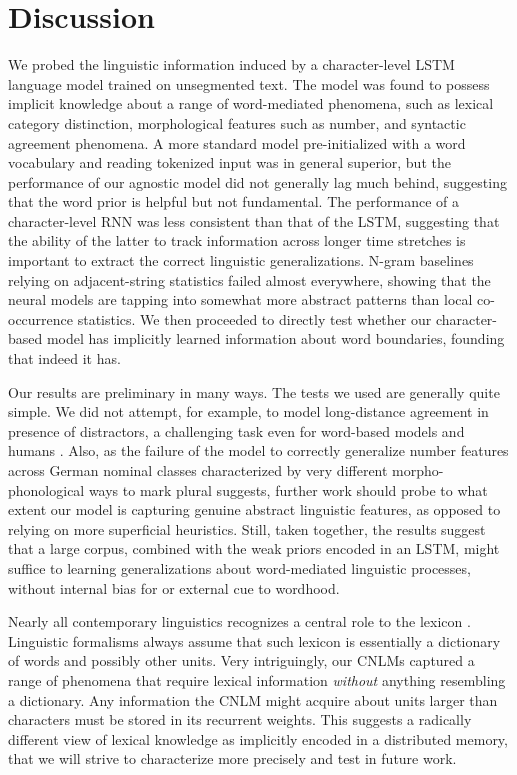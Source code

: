 \section{Discussion}
\label{sec:discussion}

We probed the linguistic information induced by a character-level LSTM
language model trained on unsegmented text. The model was found to
possess implicit knowledge about a range of word-mediated phenomena,
such as lexical category distinction, morphological features such as
number, and syntactic agreement phenomena. A more standard model
pre-initialized with a word vocabulary and reading tokenized input was
in general superior, but the performance of our agnostic model did not
generally lag much behind, suggesting that the word prior is helpful
but not fundamental. The performance of a character-level RNN was less
consistent than that of the LSTM, suggesting that the ability of the
latter to track information across longer time stretches is important
to extract the correct linguistic generalizations. N-gram baselines
relying on adjacent-string statistics failed almost everywhere,
showing that the neural models are tapping into somewhat more abstract
patterns than local co-occurrence statistics. We then proceeded to
directly test whether our character-based model has implicitly learned
information about word boundaries, founding that indeed it
has.

Our results are preliminary in many ways. The tests we used are
generally quite simple. We did not attempt, for example, to model
long-distance agreement in presence of distractors, a challenging task
even for word-based models and humans
\citep{Gulordava:etal:2018}. Also, as the failure of the model to
correctly generalize number features across German nominal classes
characterized by very different morpho-phonological ways to mark
plural suggests, further work should probe to what extent our model is
capturing genuine abstract linguistic features, as opposed to relying
on more superficial heuristics. Still, taken together, the results
suggest that a large corpus, combined with the weak priors encoded in
an LSTM, might suffice to learning generalizations about word-mediated
linguistic processes, without internal bias for or external cue to
wordhood.

Nearly all contemporary linguistics recognizes a central role to the
lexicon \cite[see, e.g.,][for very different
perspectives]{Sag:etal:2003,Goldberg:2005,Radford:2006,Bresnan:etal:2016,Jezek:2016}. Linguistic
formalisms always assume that such lexicon is essentially a dictionary
of words and possibly other units.  Very intriguingly, our CNLMs
captured a range of phenomena that require lexical information
\emph{without} anything resembling a dictionary. Any information the
CNLM might acquire about units larger than characters must be stored
in its recurrent weights. This suggests a radically different view of
lexical knowledge as implicitly encoded in a distributed memory, that
we will strive to characterize more precisely and test in future work.

